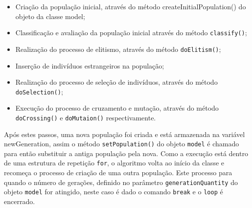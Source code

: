 \begin{itemize}
	\begin{itemize}
		\item	Criação da população inicial, através do método createInitialPopulation()
		do objeto da classe model;
		
		\item Classificação e avaliação da população inicial através do método
		\texttt{classify()};
		
		\item Realização do processo de elitismo, através do método
		\texttt{doElitism()};
		
		\item Inserção de indivíduos estrangeiros na população;
		
		\item Realização do processo de seleção de indivíduos, através do método
		\texttt{doSelection()};
		
		\item Execução do processo de cruzamento e mutação, através do método
		\texttt{doCrossing()} e \texttt{doMutaion()} respectivamente.
		
		
	\end{itemize}
	
	\par Após estes passos, uma nova população foi criada e está
	armazenada na variável newGeneration, assim o método
	\texttt{setPopulation()} do objeto \texttt{model} é chamado para então substituir
	a antiga população pela nova. Como a execução está dentro de uma estrutura de repetição
	\texttt{for}, o algoritmo volta ao início da classe e recomeça o processo de
	criação de uma outra população. Este processo para quando o número de gerações, 
	definido no parâmetro \texttt{generationQuantity} do objeto \texttt{model}
	for atingido, neste caso é dado o comando \texttt{break} e o \texttt{loop} é encerrado.
	
	
	
	
\end{itemize}

